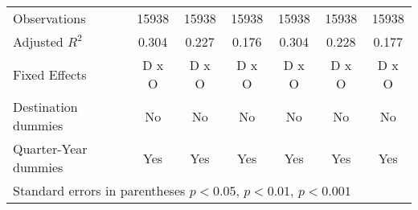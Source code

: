 \begin{table}[htbp]
\begin{tabular}{l*{6}{c}}
\hline
Observations        &       15938         &       15938         &       15938         &       15938         &       15938         &       15938         \\
Adjusted \(R^{2}\)  &       0.304         &       0.227         &       0.176         &       0.304         &       0.228         &       0.177         \\
Fixed Effects       &       D x O         &       D x O         &       D x O         &       D x O         &       D x O         &       D x O         \\
Destination dummies &          No         &          No         &          No         &          No         &          No         &          No         \\
Quarter-Year dummies&         Yes         &         Yes         &         Yes         &         Yes         &         Yes         &         Yes         \\
\hline\hline
\multicolumn{7}{l}{Standard errors in parentheses \sym{*} \(p<0.05\), \sym{**} \(p<0.01\), \sym{***} \(p<0.001\)}\\
\end{tabular}
\end{table}
